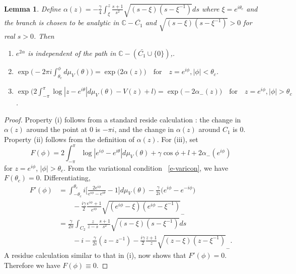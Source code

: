 \documentclass{amsart}
\newtheorem{lem}[thm]{Lemma}
\theoremstyle{definition}
\theoremstyle{remark}
\numberwithin{equation}{section}
\newcommand{\C}{\mathbb C}
\begin{document}
\begin{lem}\label{lem-alpha}
Define 
$\alpha(z) = -\frac{\gamma}4 \int^z_\xi  
\frac{s+1}{s^2}\sqrt{(s-\xi)(s - \xi^{-1})}ds$ 
where $\xi=e^{i\theta_c}$ and the branch is chosen to 
be analytic in $\C-\overline{C_1}$
and $\sqrt{(s-\xi)(s - \xi^{-1})}>0$ for real $s>0$. Then
\begin{enumerate}
\item $e^{2\alpha}$ is independent of the path in $\C-(\bar{C_1}\cup\{0\})$,.
\item $\exp\bigl( -2\pi i 
\int_{\theta_c}^\phi d\mu_V(\theta)\bigr) 
= \exp\bigl( 2\alpha(z)\bigr) \quad \text{for} \quad z=e^{i\phi}, 
|\phi|<\theta_c$.
\item $\exp\bigl( 2\int_{-\pi}^{\pi}\log |z-e^{i\theta}| d\mu_V(\theta) 
-V(z)+l\bigr)  = \exp\bigl( -2\alpha_-(z)\bigr) \quad \text{for} 
\quad z=e^{i\phi}, |\phi|>\theta_c$.
\end{enumerate}
\end{lem}
\begin{proof}
   Property (i) follows from a standard reside calculation 
: the change in $\alpha(z)$ around
the point at $0$ is $-\pi i$, and the change in $\alpha(z)$
around $C_1$ is $0$. Property (ii) follows from the definition of $\alpha(z)$.
For (iii), set 
\begin{equation*}
   F(\phi)=2\int_{-\pi}^{\pi}\log |e^{i\phi}-e^{i\theta}| d\mu_V(\theta)
+\gamma\cos{\phi} +l +2\alpha_-(e^{i\phi})
\end{equation*}
for $z=e^{i\phi}$, $|\phi|>\theta_c$.
From the variational condition ~\eqref{e-varicon}, we have $F(\theta_c)=0$.
Differentiating,
\begin{equation*}
  \begin{split}
   F'(\phi)&=\int_{-\theta_c}^{\theta_c} i\bigl[ 
\frac{2e^{i\phi}}{e^{i\phi}-e^{i\theta}}-1 \bigr] d\mu_V(\theta)
-\frac{\gamma}{2i} \bigl( e^{i\phi}-e^{-i\phi} \bigr)\\
   &\qquad -\frac{i\gamma}2\frac{e^{i\phi}+1}{e^{i\phi}}
\sqrt{(e^{i\phi}-\xi)(e^{i\phi} - \xi^{-1})}_-\\
  &= \frac{\gamma}{2\pi} \int_{C_2} \frac{z}{z-s} \frac{s+1}{s^2} 
\sqrt{(s-\xi)(s - \xi^{-1})} ds\\
   &\qquad -i-\frac{\gamma}{2i}(z-z^{-1}) -\frac{i\gamma}2\frac{z+1}{z}
\sqrt{(z-\xi)(z - \xi^{-1})}_-.
  \end{split}
\end{equation*}
A residue calculation similar to that in (i), now shows that $F'(\phi)=0$.
Therefore we have $F(\phi)\equiv 0$.
\end{proof}
\end{document}

